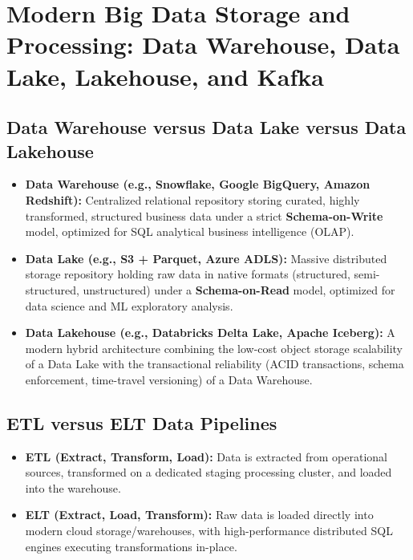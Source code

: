 \section{Modern Big Data Storage and Processing: Data Warehouse, Data Lake, Lakehouse, and Kafka}
\label{sec:modern_big_data}

\subsection{Data Warehouse versus Data Lake versus Data Lakehouse}
\begin{itemize}
    \item \textbf{Data Warehouse (e.g., Snowflake, Google BigQuery, Amazon Redshift):} Centralized relational repository storing curated, highly transformed, structured business data under a strict \textbf{Schema-on-Write} model, optimized for SQL analytical business intelligence (OLAP).
    \item \textbf{Data Lake (e.g., S3 + Parquet, Azure ADLS):} Massive distributed storage repository holding raw data in native formats (structured, semi-structured, unstructured) under a \textbf{Schema-on-Read} model, optimized for data science and ML exploratory analysis.
    \item \textbf{Data Lakehouse (e.g., Databricks Delta Lake, Apache Iceberg):} A modern hybrid architecture combining the low-cost object storage scalability of a Data Lake with the transactional reliability (ACID transactions, schema enforcement, time-travel versioning) of a Data Warehouse.
\end{itemize}

\subsection{ETL versus ELT Data Pipelines}
\begin{itemize}
    \item \textbf{ETL (Extract, Transform, Load):} Data is extracted from operational sources, transformed on a dedicated staging processing cluster, and loaded into the warehouse.
    \item \textbf{ELT (Extract, Load, Transform):} Raw data is loaded directly into modern cloud storage/warehouses, with high-performance distributed SQL engines executing transformations in-place.
\end{itemize}

